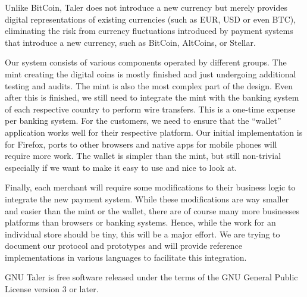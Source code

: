 Unlike BitCoin, Taler does not introduce a new currency but merely
provides digital representations of existing currencies (such as EUR,
USD or even BTC), eliminating the risk from currency fluctuations
introduced by payment systems that introduce a new currency, such as
BitCoin, AltCoins, or Stellar.

Our system consists of various components operated by different groups.
The mint creating the digital coins is mostly finished and just
undergoing additional testing and audits. The mint is also the most
complex part of the design. Even after this is finished, we still need
to integrate the mint with the banking system of each respective country
to perform wire transfers. This is a one-time expense per banking
system. For the customers, we need to ensure that the ``wallet''
application works well for their respective platform. Our initial
implementation is for Firefox, ports to other browsers and native apps
for mobile phones will require more work. The wallet is simpler than the
mint, but still non-trivial especially if we want to make it easy to use
and nice to look at.

Finally, each merchant will require some modifications to their business
logic to integrate the new payment system. While these modifications are
way smaller and easier than the mint or the wallet, there are of course
many more businesses platforms than browsers or banking systems. Hence,
while the work for an individual store should be tiny, this will be a
major effort. We are trying to document our protocol and prototypes and
will provide reference implementations in various languages to
facilitate this integration.

GNU Taler is free software released under the terms of the GNU General
Public License version 3 or later.
